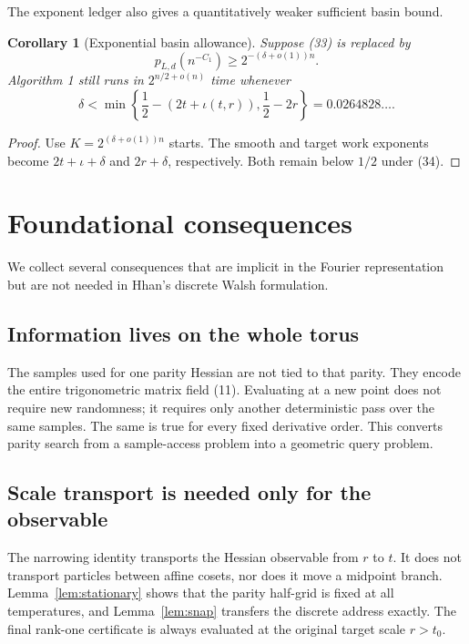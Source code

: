 \documentclass[10pt]{article}
\newtheorem{corollary}[theorem]{Corollary}
\theoremstyle{definition}
\begin{document}
The exponent ledger also gives a quantitatively weaker sufficient basin
bound.

\begin{corollary}[Exponential basin allowance]                     \label{cor:delta}
Suppose (33) is replaced by
\[
 p_{L,d}(n^{-C_1})\ge2^{-(\delta+o(1))n}.
\]
Algorithm 1 still runs in $2^{n/2+o(n)}$ time whenever
\[
 \delta<\min\left\{
 \frac12-(2t+\iota(t,r)),\frac12-2r
 \right\}=0.0264828\ldots.                                       \tag{34}
\]
\end{corollary}

\begin{proof}
Use $K=2^{(\delta+o(1))n}$ starts.  The smooth and target work exponents
become $2t+\iota+\delta$ and $2r+\delta$, respectively.  Both remain below
$1/2$ under (34).
\end{proof}

\section{Foundational consequences}

We collect several consequences that are implicit in the Fourier
representation but are not needed in Hhan's discrete Walsh formulation.

\subsection{Information lives on the whole torus}

The samples used for one parity Hessian are not tied to that parity.  They
encode the entire trigonometric matrix field (11).  Evaluating at a new point
does not require new randomness; it requires only another deterministic pass
over the same samples.  The same is true for every fixed derivative order.
This converts parity search from a sample-access problem into a geometric
query problem.

\subsection{Scale transport is needed only for the observable}

The narrowing identity transports the Hessian observable from $r$ to $t$.
It does not transport particles between affine cosets, nor does it move a
midpoint branch.  Lemma~\ref{lem:stationary} shows that the parity half-grid
is fixed at all temperatures, and Lemma~\ref{lem:snap} transfers the discrete
address exactly.  The final rank-one certificate is always evaluated at the
original target scale $r>t_0$.
\end{document}
